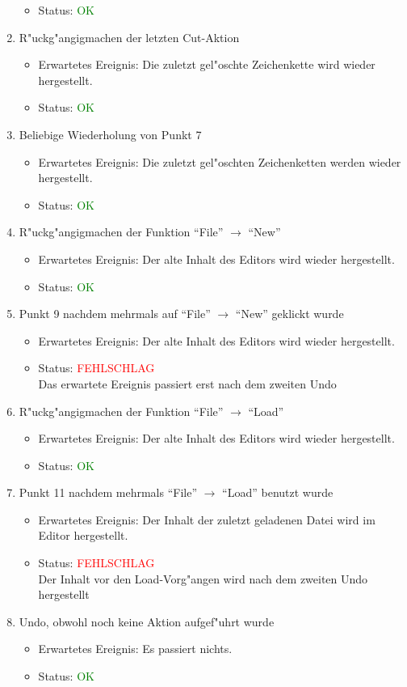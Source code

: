 \begin{enumerate}
\begin{itemize}
\item Status: \textcolor{green}{OK}
\end{itemize}
\item R"uckg"angigmachen der letzten Cut-Aktion
\begin{itemize}
\item Erwartetes Ereignis: Die zuletzt gel"oschte Zeichenkette wird wieder hergestellt. 
\item Status: \textcolor{green}{OK}
\end{itemize}
\item Beliebige Wiederholung von Punkt 7
\begin{itemize}
\item Erwartetes Ereignis: Die zuletzt gel"oschten Zeichenketten werden wieder hergestellt. 
\item Status: \textcolor{green}{OK}
\end{itemize}
\item R"uckg"angigmachen der Funktion "`File"' $\rightarrow$ "`New"'
\begin{itemize}
\item Erwartetes Ereignis: Der alte Inhalt des Editors wird wieder hergestellt. 
\item Status: \textcolor{green}{OK}
\end{itemize}
\item Punkt 9 nachdem mehrmals auf "`File"' $\rightarrow$ "`New"' geklickt wurde
\begin{itemize}
\item Erwartetes Ereignis: Der alte Inhalt des Editors wird wieder hergestellt. 
\item Status: \textcolor{red}{FEHLSCHLAG} \\
Das erwartete Ereignis passiert erst nach dem zweiten Undo
\end{itemize}
\item R"uckg"angigmachen der Funktion "`File"' $\rightarrow$ "`Load"'
\begin{itemize}
\item Erwartetes Ereignis: Der alte Inhalt des Editors wird wieder hergestellt. 
\item Status: \textcolor{green}{OK}
\end{itemize}
\item Punkt 11 nachdem mehrmals "`File"' $\rightarrow$ "`Load"' benutzt wurde
\begin{itemize}
\item Erwartetes Ereignis: Der Inhalt der zuletzt geladenen Datei wird im Editor hergestellt. 
\item Status: \textcolor{red}{FEHLSCHLAG} \\
Der Inhalt vor den Load-Vorg"angen wird nach dem zweiten Undo hergestellt
\end{itemize}
\item Undo, obwohl noch keine Aktion aufgef"uhrt wurde
\begin{itemize}
\item Erwartetes Ereignis: Es passiert nichts. 
\item Status: \textcolor{green}{OK}
\end{itemize}
\end{enumerate}
